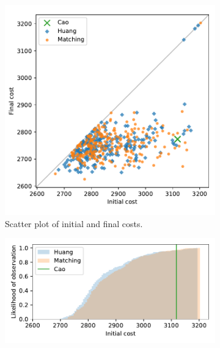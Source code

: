 \documentclass[11pt]{article}
\begin{document}
\begin{figure}
    \begin{subfigure}{.5\textwidth}
        \includegraphics[width=\linewidth]{Fig1a.pdf}
        \caption{Scatter plot of initial and final costs.}
    \end{subfigure}
    \hfill%
    \begin{subfigure}{.5\textwidth}
        \includegraphics[width=\linewidth]{Fig1b1.pdf}


\end{subfigure}
\end{figure}
\end{document}
